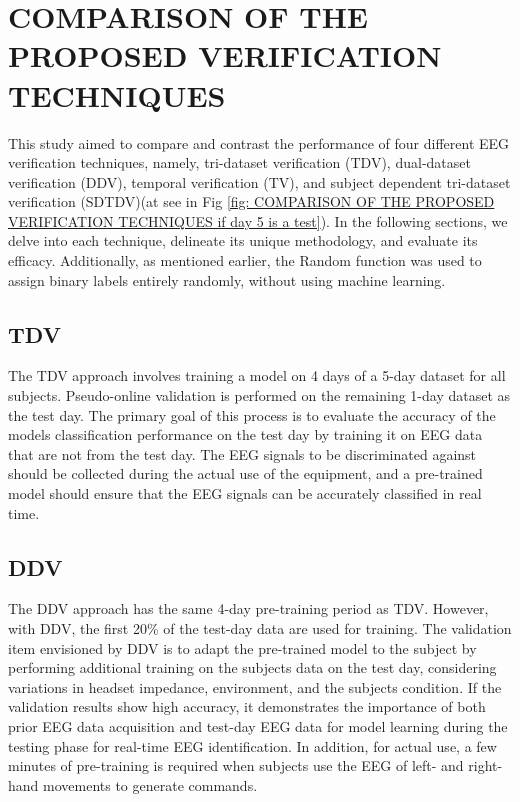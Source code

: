 \section{COMPARISON OF THE PROPOSED VERIFICATION TECHNIQUES}
  
    This study aimed to compare and contrast the performance of four different EEG
    verification techniques, namely, tri-dataset verification (TDV), dual-dataset
    verification (DDV), temporal verification (TV), and subject dependent tri-dataset
    verification (SDTDV)(at see in Fig \ref{fig: COMPARISON OF THE PROPOSED VERIFICATION TECHNIQUES if day 5 is a test}). In the following sections, we delve into each technique,
    delineate its unique methodology, and evaluate its efficacy. Additionally, as
    mentioned earlier, the Random function was used to assign binary labels entirely
    randomly, without using machine learning.
    \subsection{TDV}
    The TDV approach involves training a model on 4 days of a 5-day dataset for all
    subjects. Pseudo-online validation is performed on the remaining 1-day
    dataset as the test day. The primary goal of this process is to evaluate the
    accuracy of the models classification performance on the test day by training
    it on EEG data that are not from the test day. The EEG signals to be
    discriminated against should be collected during the actual use of the
    equipment, and a pre-trained model should ensure that the EEG signals can be
    accurately classified in real time.

    \subsection{DDV}
    The DDV approach has the same 4-day pre-training period as TDV. However, with
    DDV, the first 20\% of the test-day data are used for training. The
    validation item envisioned by DDV is to adapt the pre-trained model to the
    subject by performing additional training on the subjects data on the test
    day, considering variations in headset impedance, environment, and the subjects
    condition. If the validation results show high accuracy, it demonstrates the
    importance of both prior EEG data acquisition and test-day EEG data for model
    learning during the testing phase for real-time EEG identification. In
    addition, for actual use, a few minutes of pre-training is required when
    subjects use the EEG of left- and right-hand movements to generate commands.


